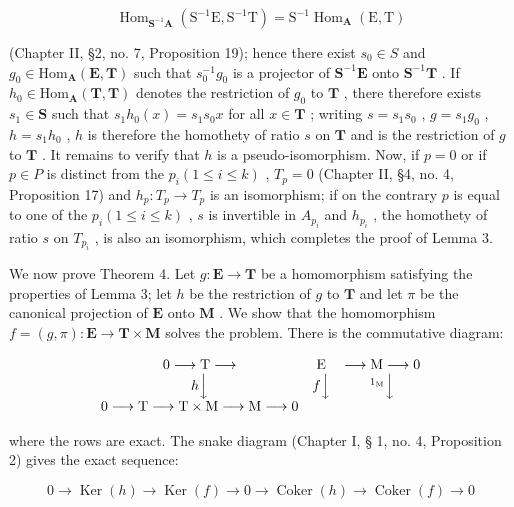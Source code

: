 \[
\operatorname{Hom} _ {\mathbf {S} ^ {- 1} \mathbf {A}} (\mathrm{S} ^ {- 1} \mathrm{E}, \mathrm{S} ^ {- 1} \mathrm{T}) = \mathrm{S} ^ {- 1} \operatorname{Hom} _ {\mathbf {A}} (\mathrm{E}, \mathrm{T})
\]

(Chapter II, §2, no. 7, Proposition 19); hence there exist \(s_0 \in S\) and \(g_0 \in \mathrm{Hom}_{\mathbf{A}}(\mathbf{E}, \mathbf{T})\) such that \(s_0^{-1}g_0\) is a projector of \(\mathbf{S}^{-1}\mathbf{E}\) onto \(\mathbf{S}^{-1}\mathbf{T}\) . If \(h_0 \in \mathrm{Hom}_{\mathbf{A}}(\mathbf{T}, \mathbf{T})\) denotes the restriction of \(g_0\) to \(\mathbf{T}\) , there therefore exists \(s_1 \in \mathbf{S}\) such that \(s_1h_0(x) = s_1s_0x\) for all \(x \in \mathbf{T}\) ; writing \(s = s_1s_0\) , \(g = s_1g_0\) , \(h = s_1h_0\) , \(h\) is therefore the homothety of ratio \(s\) on \(\mathbf{T}\) and is the restriction of \(g\) to \(\mathbf{T}\) . It remains to verify that \(h\) is a pseudo-isomorphism. Now, if \(p = 0\) or if \(p \in P\) is distinct from the \(p_i (1 \leqslant i \leqslant k)\) , \(T_p = 0\) (Chapter II, §4, no. 4, Proposition 17) and \(h_p: T_p \to T_p\) is an isomorphism; if on the contrary \(p\) is equal to one of the \(p_i (1 \leqslant i \leqslant k)\) , \(s\) is invertible in \(A_{p_i}\) and \(h_{p_i}\) , the homothety of ratio \(s\) on \(T_{p_i}\) , is also an isomorphism, which completes the proof of Lemma 3.

We now prove Theorem 4. Let \(g: \mathbf{E} \to \mathbf{T}\) be a homomorphism satisfying the properties of Lemma 3; let \(h\) be the restriction of \(g\) to \(\mathbf{T}\) and let \(\pi\) be the canonical projection of \(\mathbf{E}\) onto \(\mathbf{M}\) . We show that the homomorphism \(f = (g, \pi): \mathbf{E} \to \mathbf{T} \times \mathbf{M}\) solves the problem. There is the commutative diagram:

\[
\begin{array}{c c c} 0 \longrightarrow \mathrm{T} \longrightarrow & \mathrm{E} & \longrightarrow \mathrm{M} \longrightarrow 0 \\ h \Big \downarrow & f \Big \downarrow & ^ {1 _ {\mathrm{M}}} \Big \downarrow \\ 0 \longrightarrow \mathrm{T} \longrightarrow \mathrm{T} \times \mathrm{M} \longrightarrow \mathrm{M} \longrightarrow 0 \end{array}
\]

where the rows are exact. The snake diagram (Chapter I, § 1, no. 4, Proposition 2) gives the exact sequence:

\[
0 \rightarrow \operatorname{Ker} (h) \rightarrow \operatorname{Ker} (f) \rightarrow 0 \rightarrow \operatorname{Coker} (h) \rightarrow \operatorname{Coker} (f) \rightarrow 0
\]

